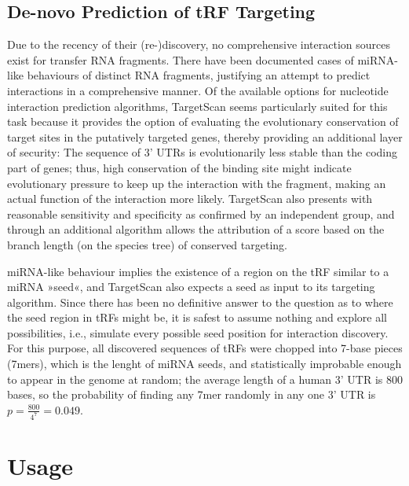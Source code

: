 \subsection{De-novo Prediction of tRF Targeting}
Due to the recency of their (re-)discovery, no comprehensive interaction sources exist for transfer RNA fragments. There have been documented cases of miRNA-like behaviours of distinct RNA fragments\cite{Cole2009,Kumar2014}, justifying an attempt to predict interactions in a comprehensive manner. Of the available options for nucleotide interaction prediction algorithms, TargetScan\cite{Friedman2009} seems particularly suited for this task because it provides the option of evaluating the evolutionary conservation of target sites in the putatively targeted genes, thereby providing an additional layer of security: The sequence of 3' UTRs is evolutionarily less stable than the coding part of genes; thus, high conservation of the binding site might indicate evolutionary pressure to keep up the interaction with the fragment, making an actual function of the interaction more likely. TargetScan also presents with reasonable sensitivity and specificity as confirmed by an independent group\cite{Alexiou2009}, and through an additional algorithm allows the attribution of a score based on the branch length (on the species tree) of conserved targeting\cite{Agarwal2015}.

miRNA-like behaviour implies the existence of a region on the tRF similar to a miRNA »seed«, and TargetScan also expects a seed as input to its targeting algorithm. Since there has been no definitive answer to the question as to where the seed region in tRFs might be, it is safest to assume nothing and explore all possibilities, i.e., simulate every possible seed position for interaction discovery. For this purpose, all discovered sequences of tRFs were chopped into 7-base pieces (7mers), which is the lenght of miRNA seeds, and statistically improbable enough to appear in the genome at random; the average length of a human 3' UTR is 800 bases, so the probability of finding any 7mer randomly in any one 3' UTR is $ p = \frac{800}{4^7} = 0.049 $.


\section{Usage}
